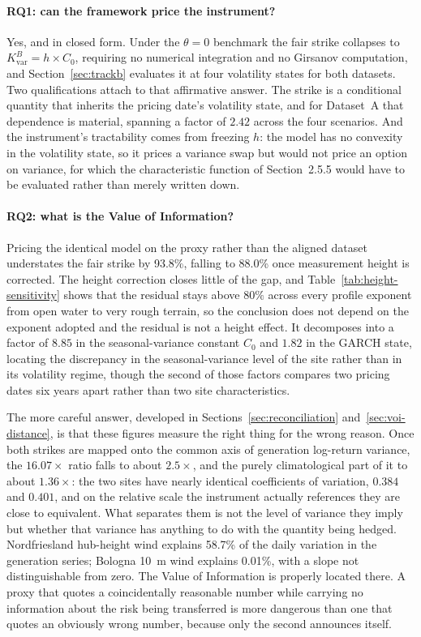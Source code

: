 \documentclass[11pt, a4paper, twoside]{article}
\begin{document}
\paragraph{RQ1: can the framework price the instrument?} Yes, and in closed form. Under the $\theta = 0$ benchmark the fair strike collapses to $K_{\text{var}}^B = h \times C_0$, requiring no numerical integration and no Girsanov computation, and Section~\ref{sec:trackb} evaluates it at four volatility states for both datasets. Two qualifications attach to that affirmative answer. The strike is a conditional quantity that inherits the pricing date's volatility state, and for Dataset~A that dependence is material, spanning a factor of $2.42$ across the four scenarios. And the instrument's tractability comes from freezing $h$: the model has no convexity in the volatility state, so it prices a variance swap but would not price an option on variance, for which the \citet{Heston1993} characteristic function of Section~2.5.5 would have to be evaluated rather than merely written down.

\paragraph{RQ2: what is the Value of Information?} Pricing the identical model on the proxy rather than the aligned dataset understates the fair strike by 93.8\%, falling to 88.0\% once measurement height is corrected. The height correction closes little of the gap, and Table~\ref{tab:height-sensitivity} shows that the residual stays above $80\%$ across every profile exponent from open water to very rough terrain, so the conclusion does not depend on the exponent adopted and the residual is not a height effect. It decomposes into a factor of $8.85$ in the seasonal-variance constant $C_0$ and $1.82$ in the GARCH state, locating the discrepancy in the seasonal-variance level of the site rather than in its volatility regime, though the second of those factors compares two pricing dates six years apart rather than two site characteristics.

The more careful answer, developed in Sections~\ref{sec:reconciliation} and~\ref{sec:voi-distance}, is that these figures measure the right thing for the wrong reason. Once both strikes are mapped onto the common axis of generation log-return variance, the $16.07\times$ ratio falls to about $2.5\times$, and the purely climatological part of it to about $1.36\times$: the two sites have nearly identical coefficients of variation, $0.384$ and $0.401$, and on the relative scale the instrument actually references they are close to equivalent. What separates them is not the level of variance they imply but whether that variance has anything to do with the quantity being hedged. Nordfriesland hub-height wind explains 58.7\% of the daily variation in the generation series; Bologna 10~m wind explains 0.01\%, with a slope not distinguishable from zero. The Value of Information is properly located there. A proxy that quotes a coincidentally reasonable number while carrying no information about the risk being transferred is more dangerous than one that quotes an obviously wrong number, because only the second announces itself.
\end{document}
